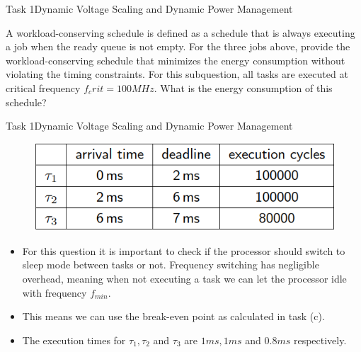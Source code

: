 \begin{frame}{Task 1}{Dynamic Voltage Scaling and Dynamic Power Management}
    \begin{tasknoinc}
    A workload-conserving schedule is deﬁned as a schedule that is always executing a job when the ready queue is not empty. For the three jobs above, provide the workload-conserving schedule that minimizes the energy consumption without violating the timing constraints. For this subquestion, all tasks are executed at critical frequency $f_crit = 100 MHz$. What is the energy consumption of this schedule?
    \end{tasknoinc}
\end{frame}
\begin{frame}{Task 1}{Dynamic Voltage Scaling and Dynamic Power Management}
    \begin{solutionnoinc}
        \begin{figure}
            \centering
            \includegraphics[scale=0.5]{figures/jobsToExecute.PNG}
        \end{figure}
        \begin{itemize}
            \item For this question it is important to check if the processor should switch to sleep mode between tasks or not. Frequency switching has negligible overhead, meaning when not executing a task we can let the processor idle with frequency $f_{min}$.
            \item This means we can use the break-even point as calculated in task (c).
            \item The execution times for $\tau_1, \tau_2$ and $\tau_3$ are $1ms, 1ms$ and $0.8ms$ respectively.
        \end{itemize}
    \end{solutionnoinc}
\end{frame}
